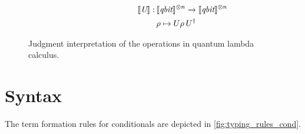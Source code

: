 \begin{figure}[H]
\begin{equation*}
\begin{split}
\begin{aligned}
  \hspace{118pt}
  \begin{minipage}[t]{0.45\textwidth}
  $\begin{aligned}
    [\![\textit{U} ]\!] : \hspace{2pt} & \llbracket \textit{qbit} \rrbracket^{\otimes n} \xrightarrow{} \llbracket 
    \textit{qbit} \rrbracket^{\otimes n} \\
    & \rho \mapsto U \rho \hspace{2pt}  U^{\dag}
  \end{aligned}$
  \end{minipage} \\
  \end{aligned}
  \end{split}
  \end{equation*}
  \caption{Judgment interpretation of the operations in quantum lambda calculus.}
  \label{fig:interpret_ops}
  \end{figure}




\section{Syntax}

The term formation rules for conditionals are depicted in
\autoref{fig:typing_rules_cond}. 

